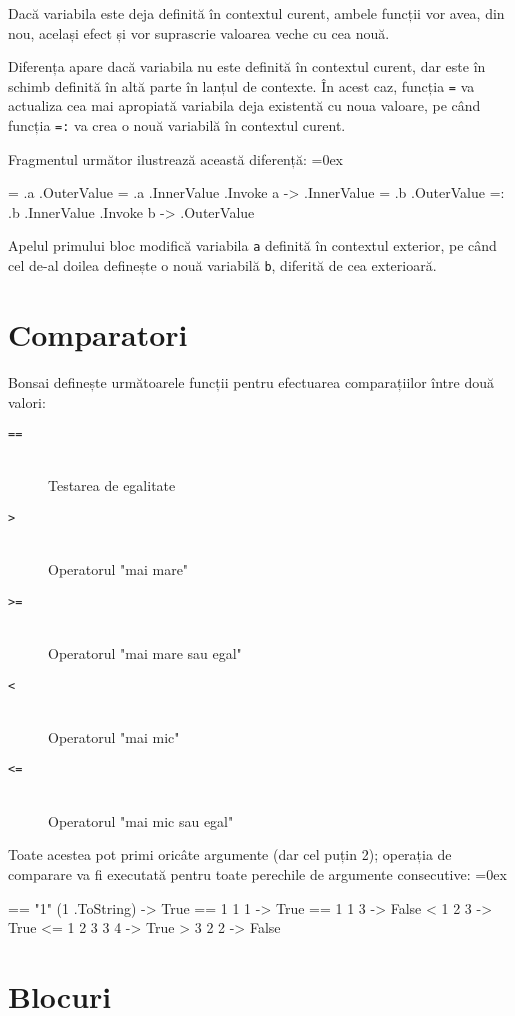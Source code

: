 \documentclass[12pt,a4paper]{memoir}
\renewcommand{\c}{\texttt}
\newenvironment{code}
{
\definecolor{shadecolor}{gray}{0.91}
\topsep=0ex
\relax
\shaded
\verbatim
}
{
\endverbatim
\endshaded
}
\begin{document}
Dacă variabila este deja definită în contextul curent, ambele funcții vor avea, din nou, același efect și vor suprascrie valoarea veche cu cea nouă.

Diferența apare dacă variabila nu este definită în contextul curent, dar este în schimb definită în altă parte în lanțul de contexte. În acest caz, funcția \c{=} va actualiza cea mai apropiată variabila deja existentă cu noua valoare, pe când funcția \c{=:} va crea o nouă variabilă în contextul curent. 

Fragmentul următor ilustrează această diferență:
\begin{code}
= .a .OuterValue
{ = .a .InnerValue } .Invoke
a
  -> .InnerValue
= .b .OuterValue
{ =: .b .InnerValue } .Invoke
b
  -> .OuterValue
\end{code}
Apelul primului bloc modifică variabila \c{a} definită în contextul exterior, pe când cel de-al doilea definește o nouă variabilă \c{b}, diferită de cea exterioară.

\section{Comparatori}

Bonsai definește următoarele funcții pentru efectuarea comparațiilor între două valori:

\begin{description}
\item[\c{==}]\hfill\\Testarea de egalitate
\item[\c{>}]\hfill\\Operatorul "mai mare"
\item[\c{>=}]\hfill\\Operatorul "mai mare sau egal"
\item[\c{<}]\hfill\\Operatorul "mai mic"
\item[\c{<=}]\hfill\\Operatorul "mai mic sau egal"
\end{description}

Toate acestea pot primi oricâte argumente (dar cel puțin 2); operația de comparare va fi executată pentru toate perechile de argumente consecutive:
\begin{code}
== "1" (1 .ToString)
  -> True
== 1 1 1
  -> True
== 1 1 3
  -> False
< 1 2 3
  -> True
<= 1 2 3 3 4
  -> True
> 3 2 2
  -> False
\end{code}

\section{Blocuri}
\end{document}
